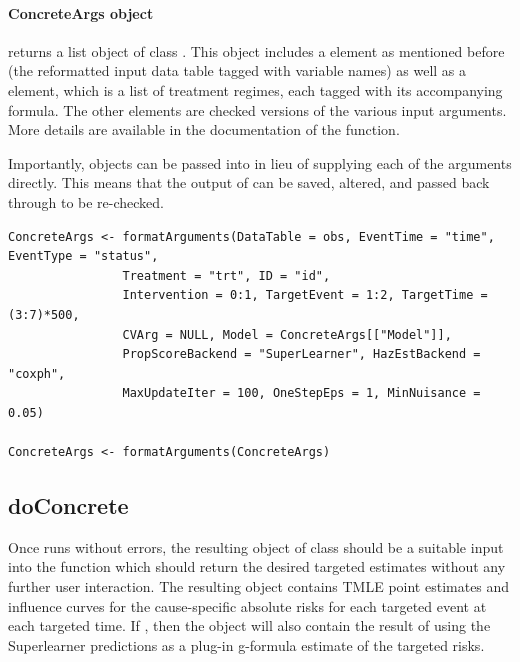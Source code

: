\documentclass{report}
\newcommand{\1}{\ensuremath{\mathbf{1}}}
\begin{document}
\paragraph{ConcreteArgs object}
\label{concreteargs}
 returns a list object of class . This object includes a  element as mentioned before (the reformatted input data table tagged with variable names) as well as a  element, which is a list of treatment regimes, each tagged with its accompanying  formula. The other elements are checked versions of the various input arguments. More details are available in the documentation of the  function.

Importantly,  objects can be passed into  in lieu of supplying each of the arguments directly. This means that the output of  can be saved, altered, and passed back through  to be re-checked.

\begin{lstlisting}
ConcreteArgs <- formatArguments(DataTable = obs, EventTime = "time", EventType = "status", 
				Treatment = "trt", ID = "id", 
				Intervention = 0:1, TargetEvent = 1:2, TargetTime = (3:7)*500, 
				CVArg = NULL, Model = ConcreteArgs[["Model"]], 
				PropScoreBackend = "SuperLearner", HazEstBackend = "coxph", 
				MaxUpdateIter = 100, OneStepEps = 1, MinNuisance = 0.05)

ConcreteArgs <- formatArguments(ConcreteArgs)
\end{lstlisting}


\subsection{doConcrete}
\label{doConcrete}
Once  runs without errors, the resulting object of class  should be a suitable input into the function  which should return the desired targeted estimates without any further user interaction. The resulting object contains TMLE point estimates and influence curves for the cause-specific absolute risks for each targeted event at each targeted time. If , then the object will also contain the result of using the Superlearner predictions as a plug-in g-formula estimate of the targeted risks.
\end{document}
